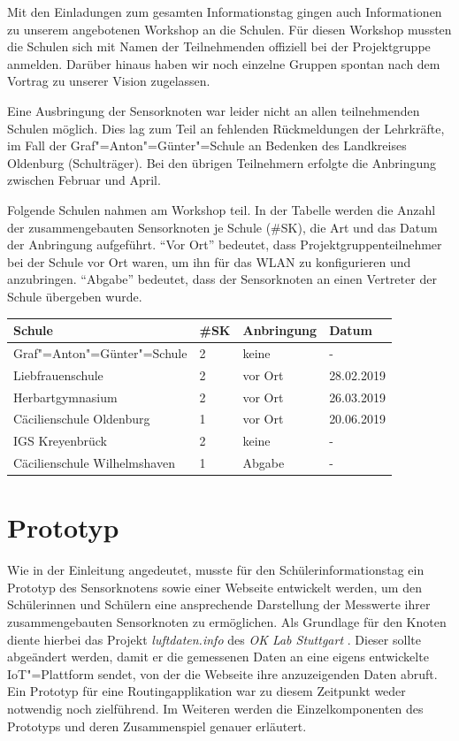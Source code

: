 Mit den Einladungen zum gesamten Informationstag gingen auch Informationen zu unserem angebotenen Workshop an die Schulen.
Für diesen Workshop mussten die Schulen sich mit Namen der Teilnehmenden offiziell bei der Projektgruppe anmelden.
Darüber hinaus haben wir noch einzelne Gruppen spontan nach dem Vortrag zu unserer Vision zugelassen.

Eine Ausbringung der Sensorknoten war leider nicht an allen teilnehmenden Schulen möglich. Dies lag zum Teil an fehlenden Rückmeldungen der Lehrkräfte, im Fall der Graf"=Anton"=Günter"=Schule an Bedenken des Landkreises Oldenburg (Schulträger).
Bei den übrigen Teilnehmern erfolgte die Anbringung zwischen Februar und April.

Folgende Schulen nahmen am Workshop teil.
In der Tabelle werden die Anzahl der zusammengebauten Sensorknoten je Schule (\#SK), die Art und das Datum der Anbringung aufgeführt.
"`Vor Ort"' bedeutet, dass Projektgruppenteilnehmer bei der Schule vor Ort waren, um ihn für das WLAN zu konfigurieren und anzubringen.
"`Abgabe"' bedeutet, dass der Sensorknoten an einen Vertreter der Schule übergeben wurde. \\

\begin{tabular}{|l|l|l|l|}
	\hline \textbf{Schule} & \textbf{\#SK} & \textbf{Anbringung} & \textbf{Datum} \\
	\hline Graf"=Anton"=Günter"=Schule & 2 & keine & - \\
	\hline Liebfrauenschule & 2 & vor Ort & 28.02.2019 \\
	\hline Herbartgymnasium & 2 & vor Ort & 26.03.2019 \\
	\hline Cäcilienschule Oldenburg & 1 & vor Ort & 20.06.2019 \\
	\hline IGS Kreyenbrück & 2 & keine & - \\
	\hline Cäcilienschule Wilhelmshaven & 1 & Abgabe & - \\
	\hline
\end{tabular}

\section{Prototyp}

Wie in der Einleitung angedeutet, musste für den Schülerinformationstag ein Prototyp des Sensorknotens sowie einer Webseite entwickelt werden, um den Schülerinnen und Schülern eine ansprechende Darstellung der Messwerte ihrer zusammengebauten Sensorknoten zu ermöglichen.
Als Grundlage für den Knoten diente hierbei das Projekt \textit{luftdaten.info} des \textit{OK Lab Stuttgart} \cite{luftdateninfo}.
Dieser sollte abgeändert werden, damit er die gemessenen Daten an eine eigens entwickelte IoT"=Plattform sendet, von der die Webseite ihre anzuzeigenden Daten abruft.
Ein Prototyp für eine Routingapplikation war zu diesem Zeitpunkt weder notwendig noch zielführend. Im Weiteren werden die Einzelkomponenten des Prototyps und deren Zusammenspiel genauer erläutert.


